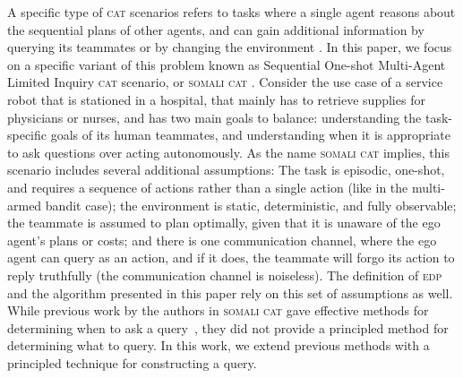\documentclass[letterpaper]{article}
\begin{document}
A specific type of \textsc{cat} scenarios refers to tasks where a single agent reasons about the sequential plans of other agents, and can gain additional information by querying its teammates or by changing the environment \cite{mirsky2018sequential,mirskypenny,shvo2020active}. In this paper, we focus on a specific variant of this problem known as Sequential One-shot Multi-Agent Limited Inquiry \textsc{cat} scenario, or \textsc{somali cat} \cite{mirskypenny}. Consider the use case of a service robot that is stationed in a hospital, that mainly has to retrieve supplies for physicians or nurses, and has two main goals to balance: understanding the task-specific goals of its human teammates, and understanding when it is appropriate to ask questions over acting autonomously. As the name \textsc{somali cat} implies, this scenario includes several additional assumptions: The task is episodic, one-shot, and requires a sequence of actions rather than a single action (like in the multi-armed bandit case); the environment is static, deterministic, and fully observable; the teammate is assumed to plan optimally, given that it is unaware of the ego agent's plans or costs; and there is one communication channel, where the ego agent can query as an action, and if it does, the teammate will forgo its action to reply truthfully (the communication channel is noiseless). The definition of \textsc{edp} and the algorithm presented in this paper rely on this set of assumptions as well. While previous work by the authors in \textsc{somali cat} gave effective methods for determining when to ask a query~\cite{mirskypenny}, they did not provide a principled method for determining what to query. In this work, we extend previous methods with a principled technique for constructing a query.
    
\end{document}

